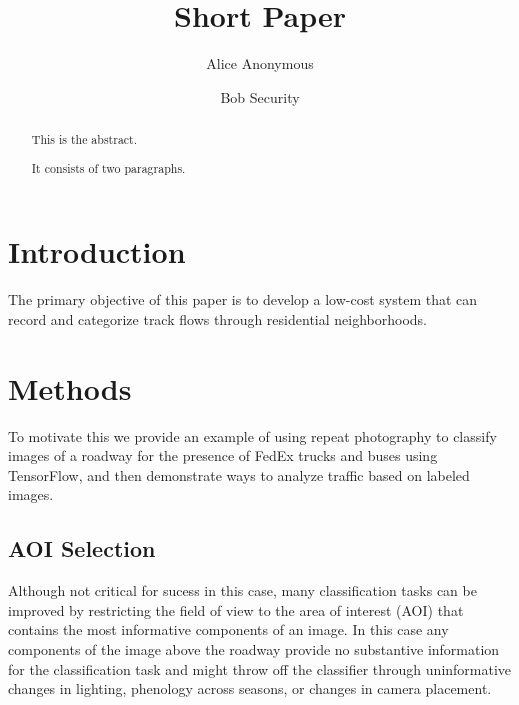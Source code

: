 \documentclass[]{elsarticle} %
\begin{document}
\begin{frontmatter}

  \title{Short Paper}
    \author[Some Institute of Technology]{Alice Anonymous}
    \author[Another University]{Bob Security}
  
      \address[Some Institute of Technology]{Department, Street, City, State, Zip}
    \address[Another University]{Department, Street, City, State, Zip}
  
  \begin{abstract}
  This is the abstract.
  
  It consists of two paragraphs.
  \end{abstract}
  
 \end{frontmatter}

\section{Introduction}\label{introduction}

The primary objective of this paper is to develop a low-cost system that
can record and categorize track flows through residential neighborhoods.

\section{Methods}\label{methods}

To motivate this we provide an example of using repeat photography to
classify images of a roadway for the presence of FedEx trucks and buses
using TensorFlow, and then demonstrate ways to analyze traffic based on
labeled images.

\subsection{AOI Selection}\label{aoi-selection}

Although not critical for sucess in this case, many classification tasks
can be improved by restricting the field of view to the area of interest
(AOI) that contains the most informative components of an image. In this
case any components of the image above the roadway provide no
substantive information for the classification task and might throw off
the classifier through uninformative changes in lighting, phenology
across seasons, or changes in camera placement.
\end{document}
